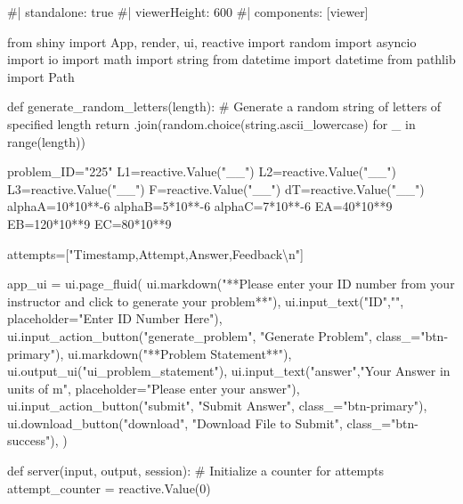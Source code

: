 \documentclass[
  letterpaper,
  DIV=11,
  numbers=noendperiod]{scrreprt}
\newenvironment{Shaded}{\begin{snugshade}}{\end{snugshade}}
\newcommand{\NormalTok}[1]{\textcolor[rgb]{0.00,0.23,0.31}{#1}}
\begin{document}
\begin{Shaded}
\begin{Highlighting}[]
\NormalTok{\#| standalone: true}
\NormalTok{\#| viewerHeight: 600}
\NormalTok{\#| components: [viewer]}

\NormalTok{from shiny import App, render, ui, reactive}
\NormalTok{import random}
\NormalTok{import asyncio}
\NormalTok{import io}
\NormalTok{import math}
\NormalTok{import string}
\NormalTok{from datetime import datetime}
\NormalTok{from pathlib import Path}

\NormalTok{def generate\_random\_letters(length):}
\NormalTok{    \# Generate a random string of letters of specified length}
\NormalTok{    return \textquotesingle{}\textquotesingle{}.join(random.choice(string.ascii\_lowercase) for \_ in range(length)) }

\NormalTok{problem\_ID="225"}
\NormalTok{L1=reactive.Value("\_\_")}
\NormalTok{L2=reactive.Value("\_\_")}
\NormalTok{L3=reactive.Value("\_\_")}
\NormalTok{F=reactive.Value("\_\_")}
\NormalTok{dT=reactive.Value("\_\_")}
\NormalTok{alphaA=10*10**{-}6}
\NormalTok{alphaB=5*10**{-}6}
\NormalTok{alphaC=7*10**{-}6}
\NormalTok{EA=40*10**9}
\NormalTok{EB=120*10**9}
\NormalTok{EC=80*10**9}

\NormalTok{attempts=["Timestamp,Attempt,Answer,Feedback\textbackslash{}n"]}

\NormalTok{app\_ui = ui.page\_fluid(}
\NormalTok{    ui.markdown("**Please enter your ID number from your instructor and click to generate your problem**"),}
\NormalTok{    ui.input\_text("ID","", placeholder="Enter ID Number Here"),}
\NormalTok{    ui.input\_action\_button("generate\_problem", "Generate Problem", class\_="btn{-}primary"),}
\NormalTok{    ui.markdown("**Problem Statement**"),}
\NormalTok{    ui.output\_ui("ui\_problem\_statement"),}
\NormalTok{    ui.input\_text("answer","Your Answer in units of m", placeholder="Please enter your answer"),}
\NormalTok{    ui.input\_action\_button("submit", "Submit Answer", class\_="btn{-}primary"),}
\NormalTok{    ui.download\_button("download", "Download File to Submit", class\_="btn{-}success"),}
\NormalTok{)}


\NormalTok{def server(input, output, session):}
\NormalTok{    \# Initialize a counter for attempts}
\NormalTok{    attempt\_counter = reactive.Value(0)}


\end{Highlighting}
\end{Shaded}
\end{document}
